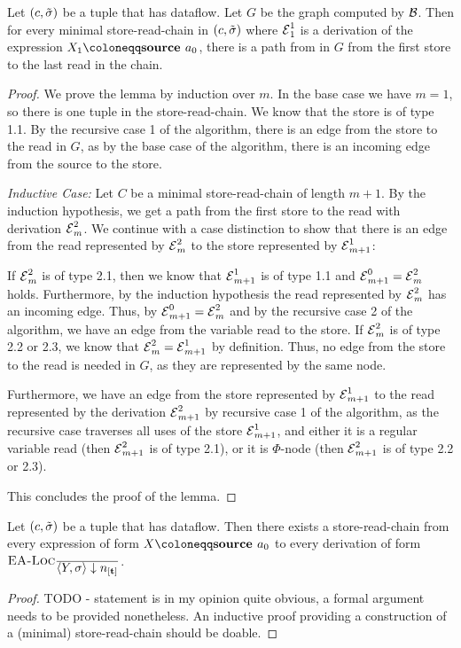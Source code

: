\begin{lemma}
    Let $(c, \tilde{\sigma}{})$ be a tuple that has dataflow.
    Let $G$ be the graph computed by $\operatorname{\mathcal{B}}$.
    Then for every minimal store-read-chain in $(c, \tilde{\sigma}{})$ where $\operatorname{\mathcal{E}}^1_1$ is a derivation of
    the expression $X_1 \coloneqq \source{a_0}$,
    there is a path from in $G$ from the first store to the last read in the chain.
    \label{lem:store-read-chain-path}
\end{lemma}
\begin{proof}
    We prove the lemma by induction over $m$.
    In the base case we have $m=1$, so there is one tuple in the store-read-chain.
    We know that the store is of type 1.1. By the recursive case 1 of the algorithm,
    there is an edge from the store to the read in $G$, as by the base case of the algorithm, there
    is an incoming edge from the source to the store.

    \emph{Inductive Case:} Let $C$ be a minimal store-read-chain of length $m+1$.
    By the induction hypothesis, we get a path from the first store to the read 
    with derivation $\operatorname{\mathcal{E}}^2_m$.
    We continue with a case distinction to show that there is an edge from the read 
    represented by $\operatorname{\mathcal{E}}^2_m$ to the store represented by $\operatorname{\mathcal{E}}^1_{m+1}$:
    
    If $\operatorname{\mathcal{E}}^2_m$ is of type 2.1, then we know that $\operatorname{\mathcal{E}}^1_{m+1}$ is of type 1.1 and $\operatorname{\mathcal{E}}^0_{m+1} = \operatorname{\mathcal{E}}^2_m$ holds.
    Furthermore, by the induction hypothesis the read represented by $\operatorname{\mathcal{E}}^2_m$ has an incoming edge.
    Thus, by $\operatorname{\mathcal{E}}^0_{m+1} = \operatorname{\mathcal{E}}^2_m$ and by the recursive case 2 of the algorithm, we have 
    an edge from the variable read to the store.
    If $\operatorname{\mathcal{E}}^2_m$ is of type 2.2 or 2.3, we know that $\operatorname{\mathcal{E}}^2_m = \operatorname{\mathcal{E}}^1_{m+1}$ by definition.
    Thus, no edge from the store to the read is needed in $G$, as they are represented by the same node.

    Furthermore, we have an edge from the store represented by $\operatorname{\mathcal{E}}^1_{m+1}$ to the read represented by 
    the derivation $\operatorname{\mathcal{E}}^2_{m+1}$ by recursive case 1 of the algorithm,
    as the recursive case traverses all uses of the store $\operatorname{\mathcal{E}}^1_{m+1}$, and either it is a regular variable read 
    (then $\operatorname{\mathcal{E}}^2_{m+1}$ is of type 2.1), or it is $\Phi$-node (then $\operatorname{\mathcal{E}}^2_{m+1}$ is of type 2.2 or 2.3).

    This concludes the proof of the lemma.
\end{proof}

\begin{lemma}
    Let $(c, \tilde{\sigma}{})$ be a tuple that has dataflow.
    Then there exists a store-read-chain 
    from every expression of form $X \coloneqq \source{a_0}$ to every 
    derivation of form $\bsrule{EA-Loc}{}{\bigstep{Y}{\sigma}{\tracked{}}}$.
    \label{lem:store-read-chain-existence}
\end{lemma}
\begin{proof}
    TODO - statement is in my opinion quite obvious, a formal argument needs to be provided nonetheless.
    An inductive proof providing a construction of a (minimal) store-read-chain should be doable.
\end{proof}
    
